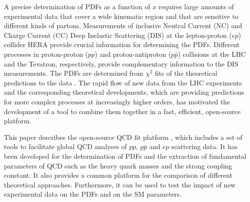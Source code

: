 A precise determination of PDFs as a function of $x$ requires large amounts of
experimental data that cover a wide kinematic region and that are sensitive to different kinds of partons. Measurements of inclusive Neutral Current (NC) and Charge Current (CC) Deep Inelastic Scattering (DIS) at the lepton-proton ($ep$) collider HERA provide crucial information for determining the PDFs. Different processes in  proton-proton ($pp$) and proton-antiproton ($p \bar p$) collisions at the LHC and the Tevatron, respectively, 
provide complementary information to the DIS measurements.
 The PDFs are determined
from $\chi^2$ fits of the theoretical predictions to the 
data \cite{MSTWpdf,CT10pdf,NNPDFpdf,Alekhin:2013nda,Jimenez-Delgado:2014twa}. 
The rapid flow of new data from the LHC experiments and the corresponding theoretical developments, which are providing predictions for more complex processes at increasingly higher orders, has motivated the development of a tool to combine them  together in a fast, efficient, open-source platform.
%

This paper describes the open-source QCD fit platform \fitter, which includes a set of tools to facilitate global 
QCD analyses of $pp$, $p\bar{p}$ and $ep$ scattering data. 
It has been developed for the determination of PDFs and the extraction of fundamental parameters of QCD such as the heavy
quark masses and the strong coupling constant. It also provides a common platform for the
comparison of different theoretical approaches. Furthermore, it can be used to test the impact 
of new experimental data on the PDFs and on the SM parameters.

